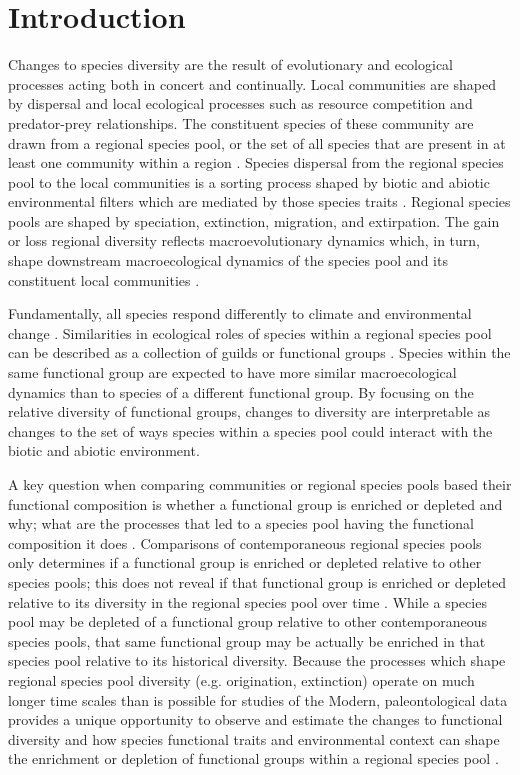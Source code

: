 \documentclass[12pt,letterpaper]{article}
\begin{document}
\section*{Introduction}
Changes to species diversity are the result of evolutionary and ecological processes acting both in concert and continually. Local communities are shaped by dispersal and local ecological processes such as resource competition and predator-prey relationships. The constituent species of these community are drawn from a regional species pool, or the set of all species that are present in at least one community within a region \citep{Mittelbach2015a,Urban2008,Harrison2008}. Species dispersal from the regional species pool to the local communities is a sorting process shaped by biotic and abiotic environmental filters which are mediated by those species traits \citep{Shipley2006,Elith2009,Urban2008,Loeuille2008,Cottenie2005,Harrison2008}. Regional species pools are shaped by speciation, extinction, migration, and extirpation. The gain or loss regional diversity reflects macroevolutionary dynamics which, in turn, shape downstream macroecological dynamics of the species pool and its constituent local communities \citep{Urban2008,Mittelbach2015a,Harrison2008}. 

Fundamentally, all species respond differently to climate and environmental change \citep{Blois2009}. Similarities in ecological roles of species within a regional species pool can be described as a collection of guilds or functional groups \citep{Valentine1969,Bambach1977,Brown1989,Simberloff1991a,Wilson1999}. Species within the same functional group are expected to have more similar macroecological dynamics than to species of a different functional group. By focusing on the relative diversity of functional groups, changes to diversity are interpretable as changes to the set of ways species within a species pool could interact with the biotic and abiotic environment. 

A key question when comparing communities or regional species pools based their functional composition is whether a functional group is enriched or depleted and why; what are the processes that led to a species pool having the functional composition it does \citep{Mcgill2006,Weber2017,Brown1989,Smith2008b,Blois2009}. Comparisons of contemporaneous regional species pools only determines if a functional group is enriched or depleted relative to other species pools; this does not reveal if that functional group is enriched or depleted relative to its diversity in the regional species pool over time \citep{Blois2009}. While a species pool may be depleted of a functional group relative to other contemporaneous species pools, that same functional group may be actually be enriched in that species pool relative to its historical diversity. Because the processes which shape regional species pool diversity (e.g. origination, extinction) operate on much longer time scales than is possible for studies of the Modern, paleontological data provides a unique opportunity to observe and estimate the changes to functional diversity and how species functional traits and environmental context can shape the enrichment or depletion of functional groups within a regional species pool \citep{Blois2009,Smith2008b}.
\end{document}
